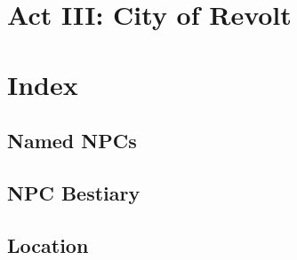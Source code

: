 \documentclass[12pt,a4paper,openany]{book}
\begin{document}
	\chapter{Act III: City of Revolt}
	\label{ch:act3}
	
	\chapter{Index}
	\section{Named NPCs}
	\section{NPC Bestiary}
	\section{Location}
	
\end{document}
